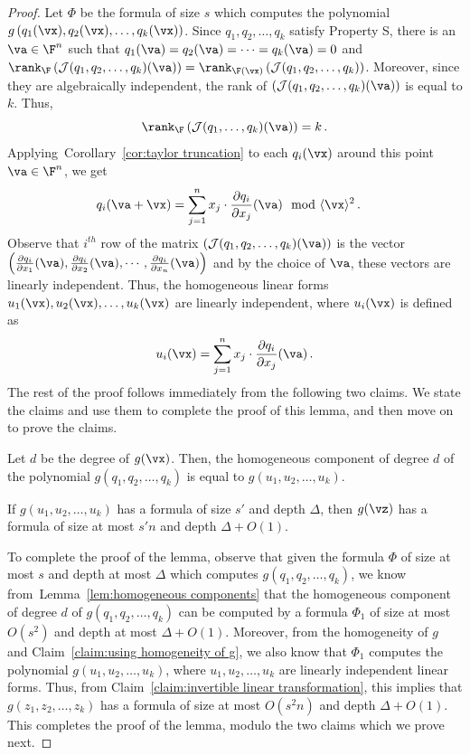 \begin{proof}
Let $\Phi$ be the formula of size $s$ which computes the polynomial $g\left(q_1(\vx), q_2(\vx), \ldots, q_k(\vx)\right)$. Since $q_1, q_2, \ldots, q_k$ satisfy Property S, there is an $\va \in \F^n$ such that $q_1(\va) = q_2(\va) = \cdots = q_k(\va) = 0$ and ${\rank}_{\F}\left({\cal J}(q_1, q_2, \ldots, q_k)(\va)\right) = \rank_{\F(\vx)}\left({\cal J}(q_1, q_2, \ldots, q_k)\right)$. Moreover, since they are algebraically independent, the rank of $\left({\cal J}(q_1, q_2, \ldots, q_k)(\va)\right)$ is equal to $k$. Thus, $${\rank}_{\F}\left({\cal J}(q_1, \ldots, q_k)(\va)\right) = k \, .$$
Applying~Corollary~\ref{cor:taylor truncation} to each $q_i(\vx)$ around this point $\va \in \F^n$, we get  
\begin{align*}
q_i(\va + \vx) &= \sum_{j = 1}^n x_j\cdot \frac{\partial q_i}{\partial x_j} (\va)  \mod \langle \vx \rangle^2 \, .
\end{align*}
Observe that $i^{th}$ row of the matrix $\left({\cal J}(q_1, q_2, \ldots, q_k)(\va)\right)$ is the vector $\left(\frac{\partial q_i}{\partial x_1} (\va), \frac{\partial q_i}{\partial x_2} (\va), \cdots, \frac{\partial q_i}{\partial x_n} (\va) \right)$ and by the choice of $\va$, these vectors  are linearly independent. Thus, the homogeneous linear forms $u_1(\vx), u_2(\vx), \ldots, u_k(\vx)$ are linearly independent, where $u_i(\vx)$ is defined as 
\[
u_i(\vx) = \sum_{j = 1}^n x_j\cdot \frac{\partial q_i}{\partial x_j} (\va)\, .
\]
The rest of the proof follows immediately from the following two claims. We state the claims and use them to complete the proof of this lemma, and then  move on to prove the claims. 
\begin{claim}\label{claim:using homogeneity of g}
Let $d$ be the degree of $g(\vx)$. Then, the homogeneous component of degree $d$ of the polynomial $g(q_1, q_2, \ldots, q_k)$ is equal to $g(u_1, u_2, \ldots, u_k)$. 
\end{claim}

\begin{claim}\label{claim:invertible linear transformation}
If $g(u_1, u_2, \ldots, u_k)$ has a formula of size $s'$ and depth $\Delta$, then $g(\vz)$ has a formula of size at most $s'n$ and depth $\Delta+O(1)$. 
\end{claim}
To complete the proof of the lemma, observe that given the formula $\Phi$ of size at most $s$ and depth at most $\Delta$ which computes $g(q_1, q_2, \ldots, q_k)$, we know from~Lemma~\ref{lem:homogeneous components} that the homogeneous component of degree $d$ of  $g(q_1, q_2, \ldots, q_k)$ can be computed by a formula $\Phi_1$ of size at most $O(s^2)$ and depth at most $\Delta+O(1)$. Moreover, from the homogeneity of $g$ and Claim~\ref{claim:using homogeneity of g}, we also know that $\Phi_1$ computes the polynomial $g(u_1, u_2, \ldots, u_k)$, where $u_1, u_2, \ldots, u_k$ are linearly independent linear forms. Thus, from Claim~\ref{claim:invertible linear transformation}, this implies that $g(z_1, z_2, \ldots, z_k)$ has a formula of size at most $O(s^2n)$ and depth $\Delta+O(1)$. This completes the proof of the lemma, modulo the two claims which we prove next. %
\end{proof}


